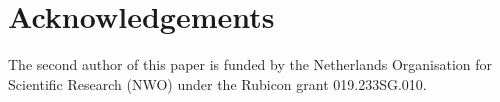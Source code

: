 \documentclass[pdflatex,sn-mathphys-num]{sn-jnl}%
\theoremstyle{thmstyleone}%
\theoremstyle{thmstyletwo}%
\theoremstyle{thmstylethree}%
\begin{document}
\section*{Acknowledgements}
The second author of this paper is funded by the Netherlands Organisation for Scientific Research (NWO) under the Rubicon grant 019.233SG.010.





\end{document}
